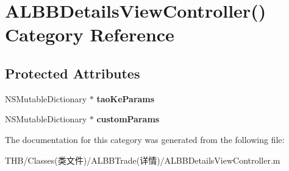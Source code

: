 \hypertarget{category_a_l_b_b_details_view_controller_07_08}{}\section{A\+L\+B\+B\+Details\+View\+Controller() Category Reference}
\label{category_a_l_b_b_details_view_controller_07_08}
\subsection*{Protected Attributes}
\begin{DoxyCompactItemize}
\item 
\mbox{\label{category_a_l_b_b_details_view_controller_07_08_ab2951220f85dbefaa1947116624b29a5}} 
N\+S\+Mutable\+Dictionary $\ast$ {\bfseries tao\+Ke\+Params}
\item 
\mbox{\label{category_a_l_b_b_details_view_controller_07_08_a014ea5f58c6d2b55669cf64c930550fd}} 
N\+S\+Mutable\+Dictionary $\ast$ {\bfseries custom\+Params}
\end{DoxyCompactItemize}


The documentation for this category was generated from the following file\+:\begin{DoxyCompactItemize}
\item 
T\+H\+B/\+Classes(类文件)/\+A\+L\+B\+B\+Trade(详情)/A\+L\+B\+B\+Details\+View\+Controller.\+m\end{DoxyCompactItemize}
